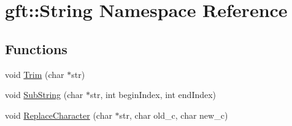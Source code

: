 \hypertarget{namespacegft_1_1String}{\section{gft\-:\-:String Namespace Reference}
\label{namespacegft_1_1String}
}
\subsection*{Functions}
\begin{DoxyCompactItemize}
\item 
void \hyperlink{namespacegft_1_1String_a9230f202a08d2b50ee9008a7ade7ffd6}{Trim} (char $\ast$str)
\item 
void \hyperlink{namespacegft_1_1String_aad0e4541847cf0c032934ed111794326}{Sub\-String} (char $\ast$str, int begin\-Index, int end\-Index)
\item 
void \hyperlink{namespacegft_1_1String_a0b14cad8e39ae5273a1d40d08db2c0b0}{Replace\-Character} (char $\ast$str, char old\-\_\-c, char new\-\_\-c)
\end{DoxyCompactItemize}


